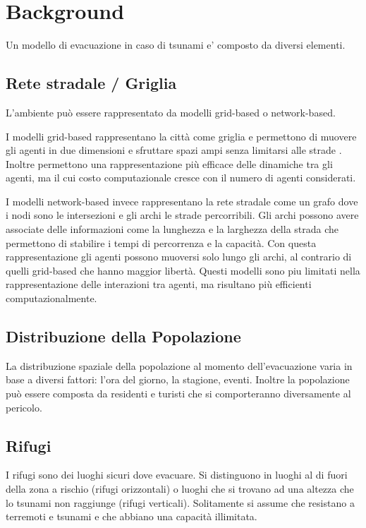 \section{Background}
Un modello di evacuazione in caso di tsunami e' composto da diversi elementi.

\subsection{Rete stradale / Griglia}
L'ambiente può essere rappresentato da modelli grid-based o network-based.

I modelli grid-based rappresentano la città come griglia e permettono di muovere gli agenti in due dimensioni 
e sfruttare spazi ampi senza limitarsi alle strade \parencite{makinoshima2018enhancing}.
Inoltre permettono una rappresentazione più efficace delle dinamiche tra gli agenti, ma il cui costo computazionale 
cresce con il numero di agenti considerati.

I modelli network-based invece rappresentano la rete stradale come un grafo dove i nodi sono le intersezioni e gli archi le strade percorribili.
Gli archi possono avere associate delle informazioni come la lunghezza e la larghezza della strada che permettono di stabilire i tempi di percorrenza e la capacità.
Con questa rappresentazione gli agenti possono muoversi solo lungo gli archi, al contrario di quelli grid-based che hanno maggior libertà.
Questi modelli sono piu limitati nella rappresentazione delle interazioni tra agenti, ma risultano più efficienti computazionalmente.

\subsection{Distribuzione della Popolazione}
La distribuzione spaziale della popolazione al momento dell'evacuazione varia in base a diversi fattori:
l'ora del giorno, la stagione, eventi. Inoltre la popolazione può essere composta da residenti e
turisti che si comporteranno diversamente al pericolo.

\subsection{Rifugi}
I rifugi sono dei luoghi sicuri dove evacuare.
Si distinguono in luoghi al di fuori della zona a rischio (rifugi orizzontali) o
luoghi che si trovano ad una altezza che lo tsunami non raggiunge (rifugi verticali).
%
Solitamente si assume che resistano a terremoti e tsunami e
che abbiano una capacità illimitata.

